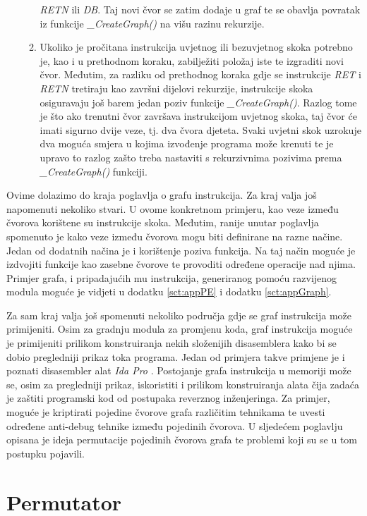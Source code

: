 \documentclass[times, utf8, diplomski, numeric]{fer}
\begin{document}
\begin{enumerate}
\begin{enumerate}
\emph{RETN} ili \emph{DB}. Taj novi čvor se zatim dodaje u graf te se obavlja
povratak iz funkcije \emph{\_CreateGraph()} na višu razinu rekurzije.
\item Ukoliko je pročitana instrukcija uvjetnog ili bezuvjetnog skoka potrebno
je, kao i u prethodnom koraku, zabilježiti položaj iste te izgraditi novi čvor.
Međutim, za razliku od prethodnog koraka gdje se instrukcije \emph{RET} i
\emph{RETN} tretiraju kao završni dijelovi rekurzije, instrukcije skoka
osiguravaju još barem jedan poziv funkcije \emph{\_CreateGraph()}. Razlog tome
je što ako trenutni čvor završava instrukcijom uvjetnog skoka, taj čvor će
imati sigurno dvije veze, tj. dva čvora djeteta. Svaki uvjetni skok uzrokuje
dva moguća smjera u kojima izvođenje programa može krenuti te je upravo to
razlog zašto treba nastaviti s rekurzivnima pozivima prema
\emph{\_CreateGraph()} funkciji.
\end{enumerate}
\end{enumerate} 
Ovime dolazimo do kraja poglavlja o grafu instrukcija. Za kraj valja još
napomenuti nekoliko stvari. U ovome konkretnom primjeru, kao veze između
čvorova korištene su instrukcije skoka. Međutim, ranije unutar poglavlja
spomenuto je kako veze između čvorova mogu biti definirane na razne načine.
Jedan od dodatnih načina je i korištenje poziva funkcija. Na taj način moguće
je izdvojiti funkcije kao zasebne čvorove te provoditi određene operacije nad
njima. Primjer grafa, i pripadajućih mu instrukcija, generiranog pomoću
razvijenog modula moguće je vidjeti u dodatku \ref{sct:appPE} i dodatku 
\ref{sct:appGraph}.

Za sam kraj valja još spomenuti nekoliko područja gdje se graf instrukcija može
primijeniti. Osim za gradnju modula za promjenu koda, graf instrukcija moguće
je primijeniti prilikom konstruiranja nekih složenijih disasemblera kako bi se
dobio pregledniji prikaz toka programa. Jedan od primjera takve primjene je i
poznati disasembler alat \emph{Ida Pro} \citep{ida}. Postojanje grafa
instrukcija u memoriji može se, osim za pregledniji prikaz, iskoristiti i
prilikom konstruiranja alata čija zadaća je zaštiti programski kod od postupaka
reverznog inženjeringa. Za primjer, moguće je kriptirati pojedine čvorove grafa
različitim tehnikama te uvesti određene anti-debug tehnike između pojedinih
čvorova. U sljedećem poglavlju opisana je ideja permutacije pojedinih čvorova
grafa te problemi koji su se u tom postupku pojavili.

\section{Permutator}
\label{sct:permutator}
\end{document}
